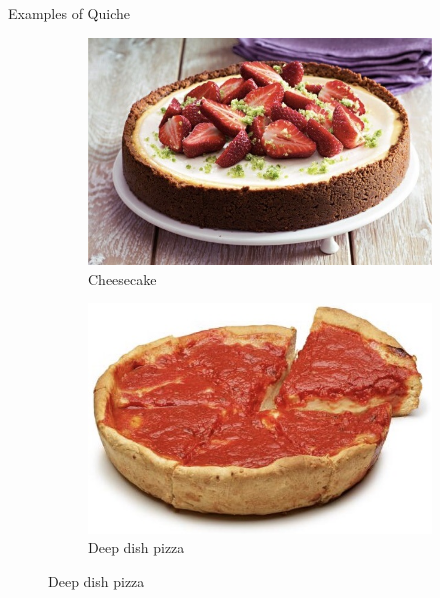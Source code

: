 \documentclass{beamer}
\begin{document}
\begin{frame}{Examples of Quiche}
    \begin{figure}
        \begin{subfigure}{.4\textwidth}
          \centering
          \includegraphics[width=.8\linewidth]{images/cube_rule_of_food/quiche/24_cheesecake.jpg}
          \caption{\label{fig:cheesecake}Cheesecake}
        \end{subfigure}
        \begin{subfigure}{.4\textwidth}
          \centering
          \includegraphics[width=.8\linewidth]{images/cube_rule_of_food/quiche/25_deep_dish.jpg}
          \caption{\label{fig:deep-dish}Deep dish pizza}
        \end{subfigure}%

\end{figure}
\end{frame}
\end{document}
